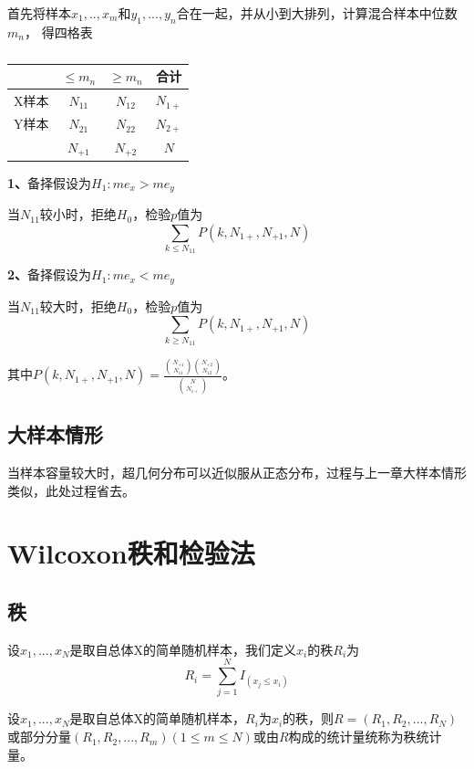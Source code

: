 \documentclass[lang=cn,10pt]{elegantbook}
\begin{document}
首先将样本$x_1,..,x_m$和$y_1,...,y_n$合在一起，并从小到大排列，计算混合样本中位数$m_n$，
得四格表
\begin{table}[hp]
    \centering
    \caption{}
    \begin{tabular}{c|c|c|c}
              & $\leq m_n$ & $\geq m_n$ & 合计     \\
        \hline
        X样本 & $N_{11}$   & $N_{12}$   & $N_{1+}$ \\
        \hline
        Y样本 & $N_{21}$   & $N_{22}$   & $N_{2+}$ \\
        \hline
              & $N_{+1}$   & $N_{+2}$   & $N$      \\
    \end{tabular}
\end{table}

\textbf{1、}备择假设为$H_1:me_x> me_y$

当$N_{11}$较小时，拒绝$H_0$，检验$p$值为
$$
    \sum_{k\leq N_{11}}P(k,N_{1+},N_{+1},N)
$$

\textbf{2、}备择假设为$H_1:me_x< me_y$

当$N_{11}$较大时，拒绝$H_0$，检验$p$值为
$$
    \sum_{k\geq N_{11}}P(k,N_{1+},N_{+1},N)
$$

其中$P(k,N_{1+},N_{+1},N) = \frac{{N_{+1} \choose N_{11}}{N_{+2} \choose N_{12}}}
    {{N \choose N_{1+}}}$。

\subsection{大样本情形}
当样本容量较大时，超几何分布可以近似服从正态分布，过程与上一章大样本情形类似，此处过程省去。

\section{Wilcoxon秩和检验法}
\subsection{秩}
\begin{definition}
    设$x_1,...,x_{N}$是取自总体X的简单随机样本，我们定义$x_{i}$的秩$R_i$为
    \begin{equation}
        R_i = \sum_{j=1}^{N}I_{(x_{j}\leq{x_{i}})}
    \end{equation}
\end{definition}

\begin{definition}
    设$x_1,...,x_{N}$是取自总体X的简单随机样本，$R_i$为$x_i$的秩，则$R = (R_1,R_2,...,R_N)$或部分分量$(R_1,R_2,...,R_m)(1\leq m \leq N)$或由$R$构成的统计量统称为秩统计量。
\end{definition}
\end{document}
